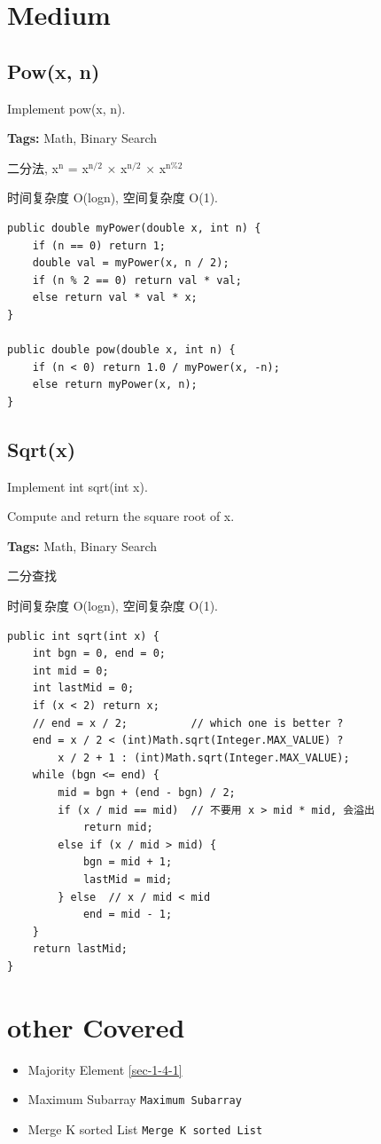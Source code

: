 \documentclass[12pt]{book}
\begin{document}
\section{Medium}
\label{sec-12-1}
\subsection{Pow(x, n)}
\label{sec-12-1-1}
Implement pow(x, n).

\textbf{Tags:} Math, Binary Search

二分法, x$^{\text{n}}$ = x$^{\text{n/2}}$ × x$^{\text{n/2}}$ × x$^{\text{n\%2}}$

时间复杂度 O(logn), 空间复杂度 O(1).
\lstset{language=java,label= ,caption= ,numbers=none}
\begin{lstlisting}
public double myPower(double x, int n) {
    if (n == 0) return 1;
    double val = myPower(x, n / 2);
    if (n % 2 == 0) return val * val;
    else return val * val * x;
}

public double pow(double x, int n) {
    if (n < 0) return 1.0 / myPower(x, -n);
    else return myPower(x, n);
}
\end{lstlisting}

\subsection{Sqrt(x)}
\label{sec-12-1-2}
Implement int sqrt(int x).

Compute and return the square root of x.

\textbf{Tags:} Math, Binary Search

二分查找

时间复杂度 O(logn), 空间复杂度 O(1).
\lstset{language=java,label= ,caption= ,numbers=none}
\begin{lstlisting}
public int sqrt(int x) {
    int bgn = 0, end = 0;
    int mid = 0;
    int lastMid = 0;
    if (x < 2) return x;
    // end = x / 2;          // which one is better ?
    end = x / 2 < (int)Math.sqrt(Integer.MAX_VALUE) ?
        x / 2 + 1 : (int)Math.sqrt(Integer.MAX_VALUE);
    while (bgn <= end) {
        mid = bgn + (end - bgn) / 2;
        if (x / mid == mid)  // 不要用 x > mid * mid, 会溢出
            return mid;
        else if (x / mid > mid) {
            bgn = mid + 1;
            lastMid = mid;
        } else  // x / mid < mid
            end = mid - 1;
    }
    return lastMid;
}
\end{lstlisting}

\section{other Covered}
\label{sec-12-2}
\begin{itemize}
\item Majority Element
\ref{sec-1-4-1}
\item Maximum Subarray
\texttt{Maximum Subarray}
\item Merge K sorted List
\texttt{Merge K sorted List}
\end{itemize}
\end{document}
